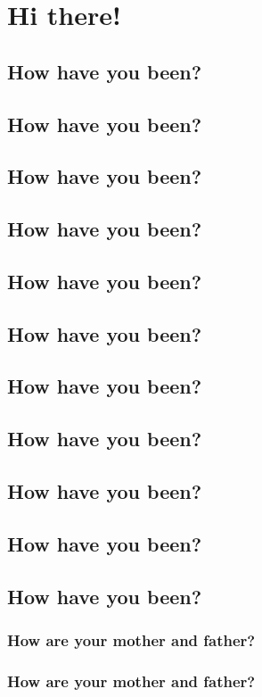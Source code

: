 \documentclass[fleqn]{report}
\begin{document}
\chapter{Hi there!}
\section{How have you been?}
\section{How have you been?}
\section{How have you been?}
\section{How have you been?}
\section{How have you been?}
\section{How have you been?}
\section{How have you been?}
\section{How have you been?}
\section{How have you been?}
\section{How have you been?}
\section{How have you been?}
\subsection{How are your mother and father?}
\subsection{How are your mother and father?}
\end{document}
